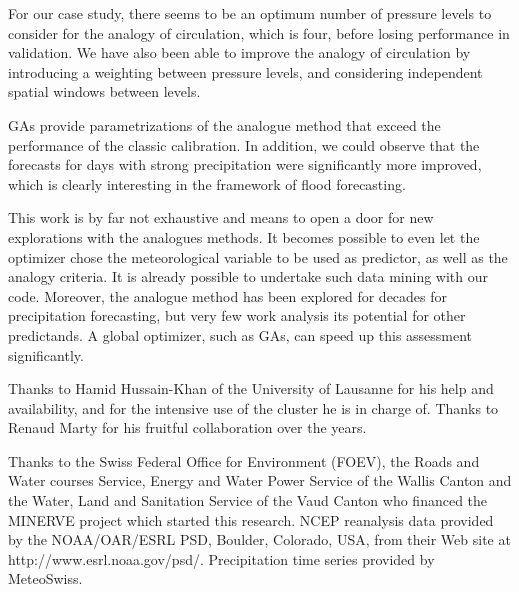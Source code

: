 \documentclass[twocol]{ametsoc}
\begin{document}
For our case study, there seems to be an optimum number of pressure levels to consider for the analogy of circulation, which is four, before losing performance in validation. We have also been able to improve the analogy of circulation by introducing a weighting between pressure levels, and considering independent spatial windows between levels.

GAs provide parametrizations of the analogue method that exceed the performance of the classic calibration. In addition, we could observe that the forecasts for days with strong precipitation were significantly more improved, which is clearly interesting in the framework of flood forecasting.

This work is by far not exhaustive and means to open a door for new explorations with the analogues methods. It becomes possible to even let the optimizer chose the meteorological variable to be used as predictor, as well as the analogy criteria. It is already possible to undertake such data mining with our code. Moreover, the analogue method has been explored for decades for precipitation forecasting, but very few work analysis its potential for other predictands. A global optimizer, such as GAs, can speed up this assessment significantly.




%
\acknowledgments
Thanks to Hamid Hussain-Khan of the University of Lausanne for his help and availability, and for the intensive use of the cluster he is in charge of. Thanks to Renaud Marty for his fruitful collaboration over the years.

Thanks to the Swiss Federal Office for Environment (FOEV), the Roads and Water courses Service, Energy and Water Power Service of the Wallis Canton and the Water, Land and Sanitation Service of the Vaud Canton who financed the MINERVE project which started this research. NCEP reanalysis data provided by the NOAA/OAR/ESRL PSD, Boulder, Colorado, USA, from their Web site at http://www.esrl.noaa.gov/psd/. Precipitation time series provided by MeteoSwiss. 


%

\end{document}

